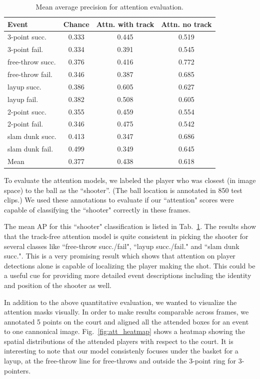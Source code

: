 \begin{table}[ht!]
\begin{center}
\small
 \begin{tabular}{|l|c|c|c|}
  \hline
Event            & Chance & Attn. with track & Attn. no track \\ \hline \hline
3-point succ.    & 0.333 & 0.445 & 0.519 \\ 
3-point fail.    & 0.334 & 0.391 & 0.545 \\ 
free-throw succ. & 0.376 & 0.416 & 0.772 \\ 
free-throw fail. & 0.346 & 0.387 & 0.685 \\  
layup succ.      & 0.386 & 0.605 & 0.627 \\ 
layup fail.      & 0.382 & 0.508 & 0.605 \\ 
2-point succ.    & 0.355 & 0.459 & 0.554 \\ 
2-point fail.    & 0.346 & 0.475 & 0.542 \\ 
slam dunk succ.  & 0.413 & 0.347 & 0.686 \\ 
slam dunk fail.  & 0.499 & 0.349 & 0.645 \\ \hline \hline  
Mean             & 0.377 & 0.438 & 0.618 \\ \hline
  \end{tabular}
\end{center}
  \caption{Mean average precision for attention evaluation.}
  \label{tab:attention_res}
\end{table}

To evaluate the attention models, we  labeled the player who was
closest (in image space) to the ball as the ``shooter''.
(The ball location is annotated in 850 test clips.)
We used these annotations to evaluate if our ``attention" scores
were capable of classifying the ``shooter" correctly in these frames.

The mean AP for this ``shooter"  classification is listed
in Tab.~\ref{tab:attention_res}.
The results show that the track-free attention model is quite consistent in picking
the shooter for several classes like ``free-throw succ./fail",
``layup succ./fail." and ``slam dunk succ.". This is a very
promising result which shows that attention on player detections
alone is capable of localizing the player making the shot. This could be
a useful cue for providing more detailed event descriptions
including the identity and position of the shooter as well.

In addition to the above quantitative evaluation, we wanted to
visualize the attention masks visually.
In order to make results comparable across frames, 
we annotated 5 points on the court and
aligned all the attended boxes for an event to one cannonical image. 
Fig.~\ref{fig:att_heatmap} shows a heatmap  showing the spatial distributions
of the attended players with respect to the court. It is interesting to note that
our model consistenly focuses under the basket for a layup, at the free-throw
line for free-throws and outside the 3-point ring for 3-pointers.

